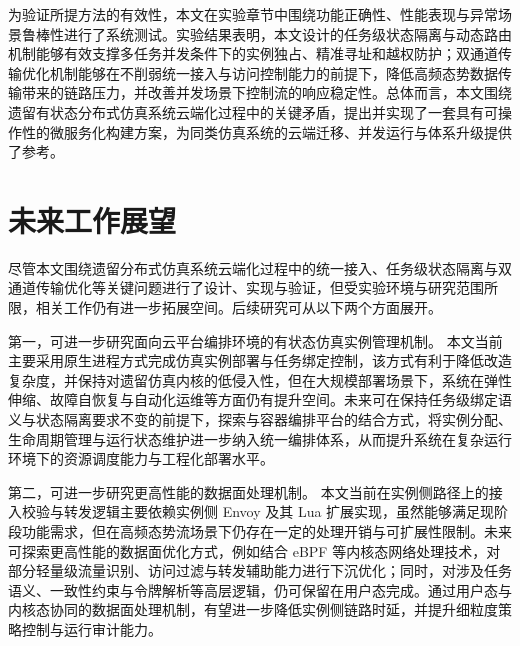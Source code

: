 \documentclass[lang=chs, degree=master, blindreview=true, winfonts=true, academic=false]{yanputhesis}
\begin{document}
为验证所提方法的有效性，本文在实验章节中围绕功能正确性、性能表现与异常场景鲁棒性进行了系统测试。实验结果表明，本文设计的任务级状态隔离与动态路由机制能够有效支撑多任务并发条件下的实例独占、精准寻址和越权防护；双通道传输优化机制能够在不削弱统一接入与访问控制能力的前提下，降低高频态势数据传输带来的链路压力，并改善并发场景下控制流的响应稳定性。总体而言，本文围绕遗留有状态分布式仿真系统云端化过程中的关键矛盾，提出并实现了一套具有可操作性的微服务化构建方案，为同类仿真系统的云端迁移、并发运行与体系升级提供了参考。

\section{未来工作展望}

尽管本文围绕遗留分布式仿真系统云端化过程中的统一接入、任务级状态隔离与双通道传输优化等关键问题进行了设计、实现与验证，但受实验环境与研究范围所限，相关工作仍有进一步拓展空间。后续研究可从以下两个方面展开。

第一，可进一步研究面向云平台编排环境的有状态仿真实例管理机制。
本文当前主要采用原生进程方式完成仿真实例部署与任务绑定控制，该方式有利于降低改造复杂度，并保持对遗留仿真内核的低侵入性，但在大规模部署场景下，系统在弹性伸缩、故障自恢复与自动化运维等方面仍有提升空间。未来可在保持任务级绑定语义与状态隔离要求不变的前提下，探索与容器编排平台的结合方式，将实例分配、生命周期管理与运行状态维护进一步纳入统一编排体系，从而提升系统在复杂运行环境下的资源调度能力与工程化部署水平。

第二，可进一步研究更高性能的数据面处理机制。
本文当前在实例侧路径上的接入校验与转发逻辑主要依赖实例侧 Envoy 及其 Lua 扩展实现，虽然能够满足现阶段功能需求，但在高频态势流场景下仍存在一定的处理开销与可扩展性限制。未来可探索更高性能的数据面优化方式，例如结合 eBPF 等内核态网络处理技术，对部分轻量级流量识别、访问过滤与转发辅助能力进行下沉优化；同时，对涉及任务语义、一致性约束与令牌解析等高层逻辑，仍可保留在用户态完成。通过用户态与内核态协同的数据面处理机制，有望进一步降低实例侧链路时延，并提升细粒度策略控制与运行审计能力。

\cleardoublepage

\appendix
\end{document}
